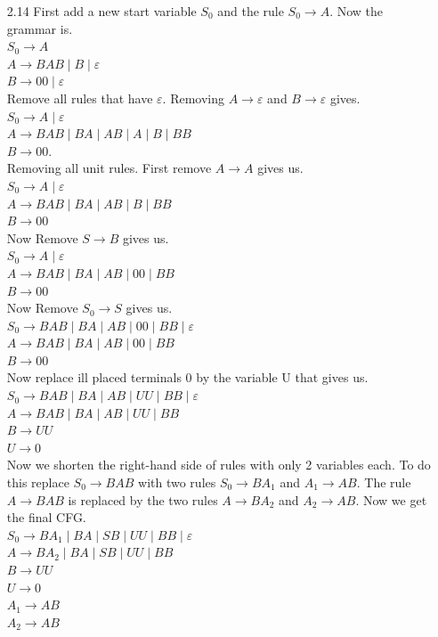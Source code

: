 \documentclass[10pt] {article}
\begin{document}
\begin{enumerate}
\item[2.14] First add a new start variable $S_0$ and the rule $S_0 \rightarrow A$.
Now the grammar is.\\
$S_0 \rightarrow A$\\
$A \rightarrow BAB \mid B \mid \varepsilon$\\
$B \rightarrow 00 \mid \varepsilon$\\
Remove all rules that have $\varepsilon$. Removing $A \rightarrow \varepsilon$ and $B \rightarrow \varepsilon$ gives.\\
$S_0 \rightarrow A \mid \varepsilon$\\
$A \rightarrow BAB \mid BA \mid AB \mid A \mid B \mid BB$\\
$B \rightarrow 00 $.\\
Removing all unit rules. First remove $A \rightarrow A$ gives us.\\
$S_0 \rightarrow A \mid \varepsilon$\\
$A \rightarrow BAB \mid BA \mid AB \mid B \mid BB$\\
$B \rightarrow 00$\\
Now Remove $S \rightarrow B$ gives us.\\
$S_0 \rightarrow A \mid \varepsilon$\\
$A \rightarrow BAB \mid BA \mid AB \mid 00 \mid BB$\\
$B \rightarrow 00$\\
Now Remove $S_0 \rightarrow S$ gives us.\\
$S_0 \rightarrow BAB \mid BA \mid AB \mid 00 \mid BB \mid \varepsilon$\\
$A \rightarrow BAB \mid BA \mid AB \mid 00 \mid BB$\\
$B \rightarrow 00$\\
Now replace ill placed terminals 0 by the variable U that gives us.\\
$S_0 \rightarrow BAB \mid BA \mid AB \mid UU \mid BB \mid \varepsilon$\\
$A \rightarrow BAB \mid BA \mid AB \mid UU \mid BB$\\
$B \rightarrow UU$\\
$U \rightarrow 0 $\\
Now we shorten the right-hand side of rules with only 2 variables each. To do this replace $S_0 \rightarrow BAB $ with two rules $S_0 \rightarrow BA_1$ and $A_1 \rightarrow AB$. The rule $A \rightarrow BAB$ is replaced by the two rules $A \rightarrow BA_2$ and $A_2 \rightarrow AB$. Now we get the final CFG.\\
$S_0 \rightarrow BA_{1} \mid BA \mid SB \mid UU \mid BB \mid \varepsilon$\\
$A \rightarrow BA_2 \mid BA \mid SB \mid UU \mid BB$\\
$B \rightarrow UU$\\
$U \rightarrow 0$\\
$A_1 \rightarrow AB$ \\
$A_2 \rightarrow AB$ 
\end{enumerate}
\end{document}
